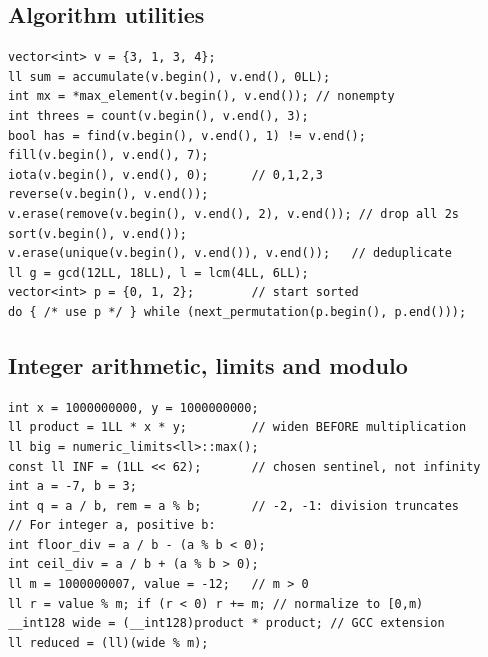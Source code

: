 \subsection{Algorithm utilities}
\begin{lstlisting}[style=cpp]
vector<int> v = {3, 1, 3, 4};
ll sum = accumulate(v.begin(), v.end(), 0LL);
int mx = *max_element(v.begin(), v.end()); // nonempty
int threes = count(v.begin(), v.end(), 3);
bool has = find(v.begin(), v.end(), 1) != v.end();
fill(v.begin(), v.end(), 7);
iota(v.begin(), v.end(), 0);      // 0,1,2,3
reverse(v.begin(), v.end());
v.erase(remove(v.begin(), v.end(), 2), v.end()); // drop all 2s
sort(v.begin(), v.end());
v.erase(unique(v.begin(), v.end()), v.end());   // deduplicate
ll g = gcd(12LL, 18LL), l = lcm(4LL, 6LL);
vector<int> p = {0, 1, 2};        // start sorted
do { /* use p */ } while (next_permutation(p.begin(), p.end()));
\end{lstlisting}

\subsection{Integer arithmetic, limits and modulo}\label{cpp:numbers}
\begin{lstlisting}[style=cpp]
int x = 1000000000, y = 1000000000;
ll product = 1LL * x * y;         // widen BEFORE multiplication
ll big = numeric_limits<ll>::max();
const ll INF = (1LL << 62);       // chosen sentinel, not infinity
int a = -7, b = 3;
int q = a / b, rem = a % b;       // -2, -1: division truncates
// For integer a, positive b:
int floor_div = a / b - (a % b < 0);
int ceil_div = a / b + (a % b > 0);
ll m = 1000000007, value = -12;   // m > 0
ll r = value % m; if (r < 0) r += m; // normalize to [0,m)
__int128 wide = (__int128)product * product; // GCC extension
ll reduced = (ll)(wide % m);
\end{lstlisting}

